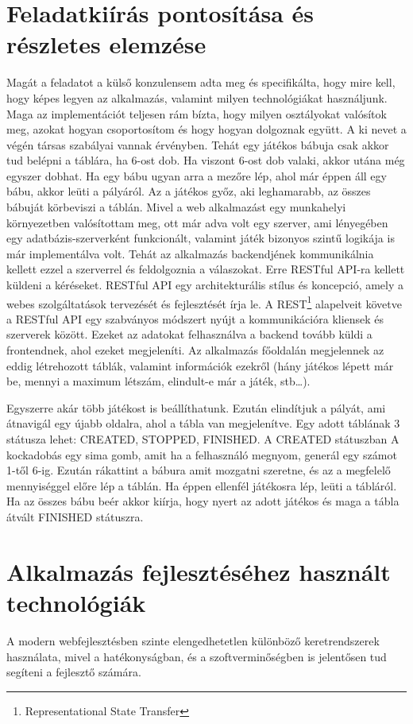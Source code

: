 \documentclass[a4paper,twoside]{article}
\begin{document}
\section{Feladatkiírás pontosítása és részletes elemzése}
Magát a feladatot a külső konzulensem adta meg és specifikálta, hogy mire kell, hogy képes
legyen az alkalmazás, valamint milyen technológiákat használjunk. Maga az implementációt
teljesen rám bízta, hogy milyen osztályokat valósítok meg, azokat hogyan csoportosítom és
hogy hogyan dolgoznak együtt.
A ki nevet a végén társas szabályai vannak érvényben. Tehát egy játékos bábuja csak akkor
tud belépni a táblára, ha 6-ost dob. Ha viszont 6-ost dob valaki, akkor utána még egyszer
dobhat. Ha egy bábu ugyan arra a mezőre lép, ahol már éppen áll egy bábu, akkor leüti a
pályáról. Az a játékos győz, aki leghamarabb, az összes bábuját körbeviszi a táblán.
Mivel a web alkalmazást egy munkahelyi környezetben valósítottam meg, ott már adva volt
egy szerver, ami lényegében egy adatbázis-szerverként funkcionált, valamint játék bizonyos
szintű logikája is már implementálva volt. Tehát az alkalmazás backendjének kommunikálnia
kellett ezzel a szerverrel és feldolgoznia a válaszokat. Erre RESTful API-ra kellett küldeni a
kéréseket. RESTful API egy architekturális stílus és koncepció, amely a webes szolgáltatások
tervezését és fejlesztését írja le. A REST\footnote{Representational State Transfer} alapelveit követve
a RESTful API egy szabványos módszert nyújt a kommunikációra kliensek és szerverek
között. Ezeket az adatokat felhasználva a backend tovább küldi a frontendnek, ahol ezeket
megjeleníti.
Az alkalmazás főoldalán megjelennek az eddig létrehozott táblák, valamint információk
ezekről (hány játékos lépett már be, mennyi a maximum létszám, elindult-e már a játék,
stb…). 

Egyszerre akár több játékost is beállíthatunk. Ezután elindítjuk a pályát, ami átnavigál egy
újabb oldalra, ahol a tábla van megjelenítve. Egy adott táblának 3 státusza lehet: CREATED,
STOPPED, FINISHED. A CREATED státuszban A kockadobás egy sima gomb, amit ha a
felhasználó megnyom, generál egy számot 1-től 6-ig. Ezután rákattint a bábura amit mozgatni
szeretne, és az a megfelelő mennyiséggel előre lép a táblán. Ha éppen ellenfél játékosra lép,
leüti a tábláról. Ha az összes bábu beér akkor kiírja, hogy nyert az adott játékos és maga a
tábla átvált FINISHED státuszra. 
\newpage
\section{Alkalmazás fejlesztéséhez használt technológiák}
A modern webfejlesztésben szinte elengedhetetlen különböző keretrendszerek használata,
mivel a hatékonyságban, és a szoftverminőségben is jelentősen tud segíteni a fejlesztő
számára. 
\end{document}
